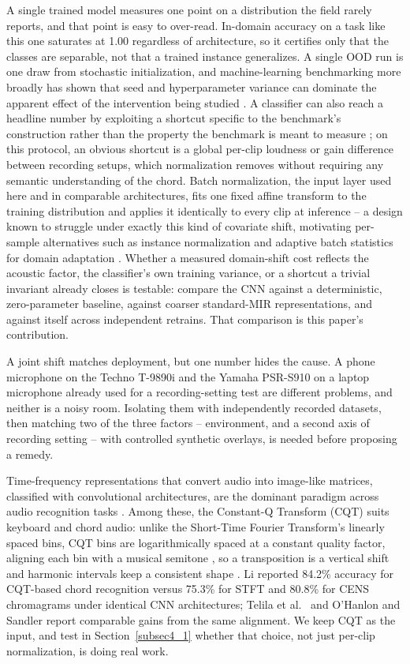 \documentclass[pdflatex,sn-mathphys-num,iicol]{sn-jnl}
\theoremstyle{thmstyleone}
\theoremstyle{thmstyletwo}
\theoremstyle{thmstylethree}
\begin{document}
A single trained model measures one point on a distribution the field rarely reports, and that point is easy to over-read. In-domain accuracy on a task like this one saturates at 1.00 regardless of architecture, so it certifies only that the classes are separable, not that a trained instance generalizes. A single OOD run is one draw from stochastic initialization, and machine-learning benchmarking more broadly has shown that seed and hyperparameter variance can dominate the apparent effect of the intervention being studied \cite{Bouthillier2021}. A classifier can also reach a headline number by exploiting a shortcut specific to the benchmark's construction rather than the property the benchmark is meant to measure \cite{Geirhos2020}; on this protocol, an obvious shortcut is a global per-clip loudness or gain difference between recording setups, which normalization removes without requiring any semantic understanding of the chord. Batch normalization, the input layer used here and in comparable architectures, fits one fixed affine transform to the training distribution and applies it identically to every clip at inference -- a design known to struggle under exactly this kind of covariate shift, motivating per-sample alternatives such as instance normalization \cite{Ulyanov2016} and adaptive batch statistics for domain adaptation \cite{Li2016}. Whether a measured domain-shift cost reflects the acoustic factor, the classifier's own training variance, or a shortcut a trivial invariant already closes is testable: compare the CNN against a deterministic, zero-parameter baseline, against coarser standard-MIR representations, and against itself across independent retrains. That comparison is this paper's contribution.

A joint shift matches deployment, but one number hides the cause. A phone microphone on the Techno T-9890i and the Yamaha PSR-S910 on a laptop microphone already used for a recording-setting test are different problems, and neither is a noisy room. Isolating them with independently recorded datasets, then matching two of the three factors -- environment, and a second axis of recording setting -- with controlled synthetic overlays, is needed before proposing a remedy.

Time-frequency representations that convert audio into image-like matrices, classified with convolutional architectures, are the dominant paradigm across audio recognition tasks \cite{Wolf-Monheim2025}\cite{Zaman2023}\cite{Moysis2023}. Among these, the Constant-Q Transform (CQT) suits keyboard and chord audio: unlike the Short-Time Fourier Transform's linearly spaced bins, CQT bins are logarithmically spaced at a constant quality factor, aligning each bin with a musical semitone \cite{Lacoste2007}, so a transposition is a vertical shift and harmonic intervals keep a consistent shape \cite{Li2021}. Li \cite{Li2021} reported 84.2\% accuracy for CQT-based chord recognition versus 75.3\% for STFT and 80.8\% for CENS chromagrams under identical CNN architectures; Telila et al.\ \cite{Telila2023} and O'Hanlon and Sandler \cite{OHanlon2021} report comparable gains from the same alignment. We keep CQT as the input, and test in Section~\ref{subsec4_1} whether that choice, not just per-clip normalization, is doing real work.
\end{document}
